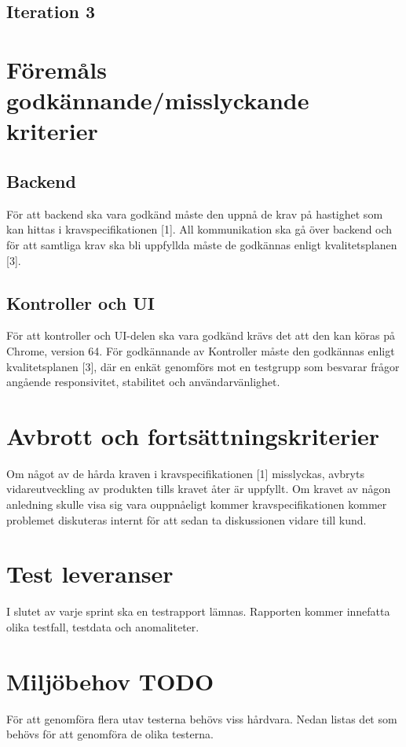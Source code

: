 \documentclass[10pt]{article}
\begin{document}
\subsection{Iteration 3}
	
	
	

\section{Föremåls godkännande/misslyckande kriterier}
	\subsection{Backend}
		För att backend ska vara godkänd måste den uppnå de krav på hastighet som kan hittas i kravspecifikationen {\color{red}[1]}. All kommunikation ska gå över backend och för att samtliga krav ska bli uppfyllda måste de godkännas enligt kvalitetsplanen  {\color{red}[3]}.

	\subsection{Kontroller och UI}
		För att kontroller och UI-delen ska vara godkänd krävs det att den kan köras på Chrome, version 64. För godkännande av Kontroller måste den godkännas enligt kvalitetsplanen {\color{red}[3]}, där en enkät genomförs mot en testgrupp som besvarar frågor angående responsivitet, stabilitet och användarvänlighet.



\section{Avbrott och fortsättningskriterier}
	Om något av de hårda kraven i kravspecifikationen {\color{red}[1]} misslyckas, avbryts vidareutveckling av produkten tills kravet åter är uppfyllt. Om kravet av någon anledning skulle visa sig vara ouppnåeligt kommer kravspecifikationen kommer problemet diskuteras internt för att sedan ta diskussionen vidare till kund. 



\section{Test leveranser}
	I slutet av varje sprint ska en testrapport lämnas. Rapporten kommer innefatta olika testfall, testdata och anomaliteter.


	

\section{Miljöbehov {\color{red}TODO}}
	För att genomföra flera utav testerna behövs viss hårdvara. Nedan listas det som behövs för att genomföra de olika testerna. 
\end{document}
